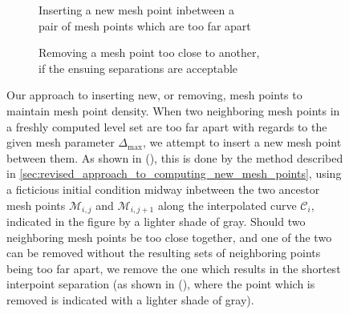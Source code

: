 \begin{figure}[htpb]
    \centering
    \begin{subfigure}[b]{0.475\textwidth}
        \centering
        \resizebox{0.9\linewidth}{!}%
        {}
        \caption[]{{\small Inserting a new mesh point inbetween a
        \\\phantom{(a)} pair of mesh points which are too far apart}}
        \label{fig:mesh_management_pure_insertion}
    \end{subfigure}
    \begin{subfigure}[b]{0.475\textwidth}
        \centering
        \resizebox{0.9\linewidth}{!}%
        {}
        \caption[]{{\small Removing a mesh point too close to another,
        \\\phantom{(b)} if the ensuing separations are acceptable}}
        \label{fig:mesh_management_pure_deletion}
    \end{subfigure}
    \caption[Our approach to inserting new, or removing, mesh points to
    maintain mesh point density]
    {Our approach to inserting new, or removing, mesh points to maintain
        mesh point density. When two neighboring mesh points in a freshly
        computed level set are too far apart with regards to the given mesh
        parameter $\Delta_{\max}$, we attempt to insert a new mesh point
        between them. As shown in
        (), this is done by
        the method described in
        \cref{sec:revised_approach_to_computing_new_mesh_points}, using a
        ficticious initial condition midway inbetween the two ancestor mesh
        points $\mathcal{M}_{i,j}$ and $\mathcal{M}_{i,j+1}$ along the
        interpolated curve $\mathcal{C}_{i}$, indicated in the figure by
        a lighter shade of gray. Should two neighboring mesh points
        be too close together, and one of the two can be removed without the
        resulting sets of neighboring points being too far apart, we remove
        the one which results in the shortest interpoint separation (as shown
        in (), where the point
        which is removed is indicated with a lighter shade of gray).
    }
    \label{fig:mesh_management_insertion_and_deletion}
\end{figure}
